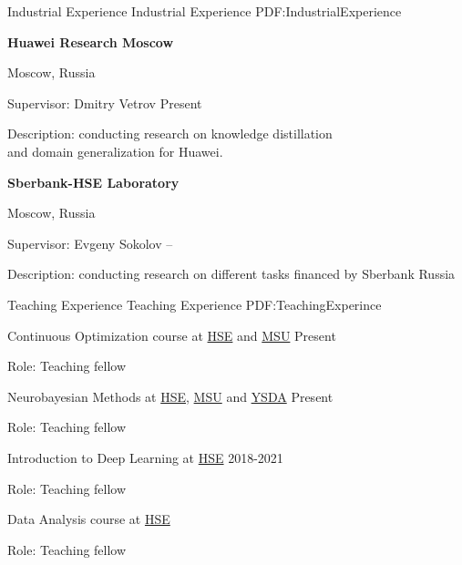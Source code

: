 \documentclass[letterpaper,MMMyyyy,nonstopmode]{simpleresumecv}
\begin{document}
\begin{Body}

\Section
{Industrial Experience}
{Industrial Experience}
{PDF:IndustrialExperience}

\Entry
\textbf{Huawei Research Moscow}
\par
Moscow, Russia

\Gap
\BulletItem
Supervisor: Dmitry Vetrov
\hfill
Present
\begin{Detail}
\SubBulletItem
Description: conducting research on knowledge distillation\\and domain generalization for Huawei.
\end{Detail}

\Gap

\Entry
\textbf{Sberbank-HSE Laboratory}
\par
Moscow, Russia

\Gap
\BulletItem
Supervisor: Evgeny Sokolov
\hfill
{} --
\begin{Detail}
\SubBulletItem
Description: conducting research on different tasks financed by Sberbank Russia
\end{Detail}



\Section
{Teaching Experience}
{Teaching Experience}
{PDF:TeachingExperince}

\BulletItem
Continuous Optimization course at \href{https://cs.hse.ru/en/}{HSE} and \href{https://cs.msu.ru/en}{MSU}
\hfill
Present
\begin{Detail}
\Item
Role: Teaching fellow
\end{Detail}

\BulletItem
Neurobayesian Methods at \href{https://cs.hse.ru/en/}{HSE}, \href{https://cs.msu.ru/en}{MSU} and \href{https://yandexdataschool.com}{YSDA}
\hfill
Present
\begin{Detail}
\Item
Role: Teaching fellow
\end{Detail}

\BulletItem
Introduction to Deep Learning at \href{https://cs.hse.ru/en/}{HSE}
\hfill
2018-2021
\begin{Detail}
\Item
Role: Teaching fellow
\end{Detail}

\BulletItem
Data Analysis course at \href{https://cs.hse.ru/en/}{HSE}
\hfill
{}
\begin{Detail}
\Item
Role: Teaching fellow
\end{Detail}


\end{Body}
\end{document}
